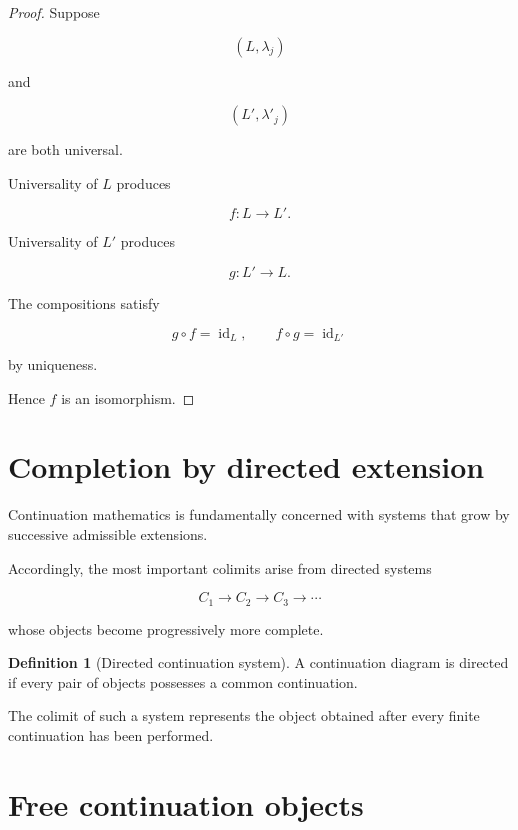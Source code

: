 \documentclass[13pt,openany]{book}
\theoremstyle{plain}
\theoremstyle{definition}
\newtheorem{definition}{Definition}[chapter]
\begin{document}
\begin{proof}
Suppose

\[
(L,\lambda_j)
\]

and

\[
(L',\lambda'_j)
\]

are both universal.

Universality of \(L\) produces

\[
f:L\rightarrow L'.
\]

Universality of \(L'\) produces

\[
g:L'\rightarrow L.
\]

The compositions satisfy

\[
g\circ f=\operatorname{id}_L,
\qquad
f\circ g=\operatorname{id}_{L'}
\]

by uniqueness.

Hence \(f\) is an isomorphism.
\end{proof}

\section{Completion by directed extension}

Continuation mathematics is fundamentally concerned with systems that grow by
successive admissible extensions.

Accordingly, the most important colimits arise from directed systems

\[
C_1
\longrightarrow
C_2
\longrightarrow
C_3
\longrightarrow
\cdots
\]

whose objects become progressively more complete.

\begin{definition}[Directed continuation system]
A continuation diagram is directed if every pair of objects possesses a common
continuation.
\end{definition}

The colimit of such a system represents the object obtained after every finite
continuation has been performed.

\section{Free continuation objects}
\end{document}

